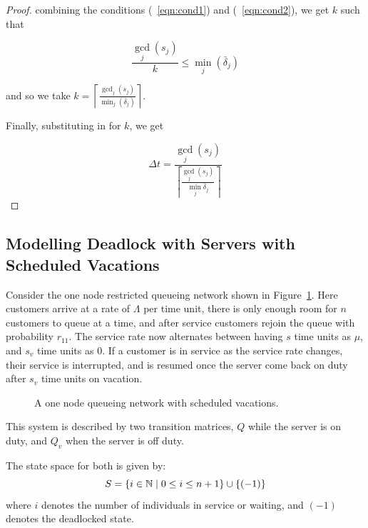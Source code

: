 \documentclass{article}
\begin{document}
\begin{proof}
combining the conditions (~\ref{eqn:cond1}) and (~\ref{eqn:cond2}), we get $k$ such that

\begin{equation*}
\frac{\gcd_j(s_j)}{k} \leq \min_j(\bar{\delta}_j)
\end{equation*}

and so we take $k = \left\lceil \frac{\gcd_j(s_j)}{\min_j(\bar{\delta}_j)} \right\rceil$.

Finally, substituting in for $k$, we get

\begin{equation*}
\Delta t = \frac{\gcd_j(s_j)}{\left\lceil \frac{\gcd_j(s_j)}{\min_j \bar{\delta}_j} \right\rceil}
\end{equation*}

\end{proof}



\subsection{Modelling Deadlock with Servers with Scheduled Vacations}

Consider the one node restricted queueing network shown in Figure~\ref{fig:1nodescheduledvacations}.
Here customers arrive at a rate of $\Lambda$ per time unit, there is only enough room for $n$ customers to queue at a time, and after service customers rejoin the queue with probability $r_{11}$. The service rate now alternates between having $s$ time units as $\mu$, and $s_v$ time units as $0$. If a customer is in service as the service rate changes, their service is interrupted, and is resumed once the server come back on duty after $s_v$ time units on vacation.

\begin{figure}[!hbtp]
    \begin{center}
        
    \end{center}
    \caption{A one node queueing network with scheduled vacations.}
    \label{fig:1nodescheduledvacations}
\end{figure}

This system is described by two transition matrices, $Q$ while the server is on duty, and $Q_v$ when the server is off duty.

The state space for both is given by:
        \[S = \{i\in\mathbb{N} \nonscript\; | \nonscript\; 0 \leq i \leq n + 1
        \}\cup\{(-1)\}\]
where \(i\) denotes the number of individuals in service or waiting, and $(-1)$ denotes the deadlocked state.
\end{document}
